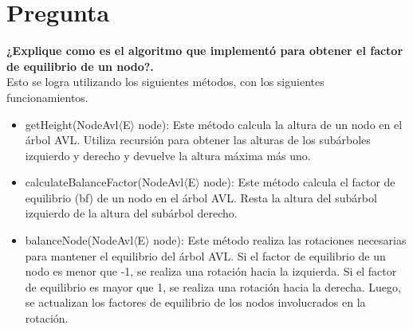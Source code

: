 





\section{Pregunta}
\textbf{¿Explique como es el algoritmo que implementó para obtener el factor de equilibrio de un nodo?.}\\

Esto se logra utilizando los siguientes métodos, con los siguientes funcionamientos.
\begin{itemize}
    \item getHeight(NodeAvl$\langle $E$\rangle$ node): Este método calcula la altura de un nodo en el árbol AVL. Utiliza recursión para obtener las alturas de los subárboles izquierdo y derecho y devuelve la altura máxima más uno.

    \item calculateBalanceFactor(NodeAvl$\langle $E$\rangle$  node): Este método calcula el factor de equilibrio (bf) de un nodo en el árbol AVL. Resta la altura del subárbol izquierdo de la altura del subárbol derecho. 

    \item balanceNode(NodeAvl$\langle $E$\rangle$  node): Este método realiza las rotaciones necesarias para mantener el equilibrio del árbol AVL. Si el factor de equilibrio de un nodo es menor que -1, se realiza una rotación hacia la izquierda. Si el factor de equilibrio es mayor que 1, se realiza una rotación hacia la derecha. Luego, se actualizan los factores de equilibrio de los nodos involucrados en la rotación.
\end{itemize}